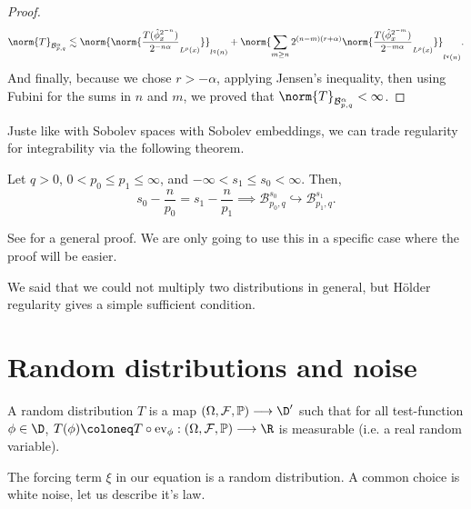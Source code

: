 \begin{proof}
     \begin{equation*}
        \norm{T}_{\mathcal{B}^\alpha_{p,q}} \lesssim \norm{\norm{\frac{T(\hat{\phi}^{2^{-n}}_{x})}{2^{-n\alpha}}_{L^p(x)}}}_{l^q(n)} +  \norm{\sum_{m\geq n} 2^{(n-m)(r+\alpha)} \norm{\frac{T(\hat{\phi}^{2^{-m}}_{x})}{2^{-m\alpha}}_{L^p(x)}}}_{l^q(n)}.
    \end{equation*}
    And finally, because we chose $r>-\alpha$, applying Jensen's inequality, then using Fubini for the sums in $n$ and $m$, we proved that $\norm{T}_{\mathcal{B}^\alpha_{p,q}}<\infty$.





    
\end{proof}


Juste like with Sobolev spaces with Sobolev embeddings, we can trade regularity for integrability via the following theorem.

\begin{theorem}
    Let $q>0$, $0<p_0 \leq p_1 \leq \infty$, and $-\infty < s_1 \leq s_0 < \infty$.
    Then,
    $$s_0 - \frac{n}{p_0} = s_1 - \frac{n}{p_1} \implies \mathcal{B}^{s_0}_{p_0,q} \hookrightarrow \mathcal{B}^{s_1}_{p_1,q}.$$
\end{theorem}

See \cite{Tri83} for a general proof. We are only going to use this in a specific case where the proof will be easier.

We said that we could not multiply two distributions in general, but Hölder regularity gives a simple sufficient condition.


    



\section{Random distributions and noise}

\begin{definition}
    A random distribution $T$ is a map $(\Omega, \mathcal{F}, \mathbb{P}) \longrightarrow \D'$ such that for all test-function $\phi \in \D$,
    $T(\phi)\coloneq T \circ \text{ev}_\phi : (\Omega, \mathcal{F}, \mathbb{P}) \longrightarrow \R$ is measurable (i.e. a real random variable).
\end{definition}

The forcing term $\xi$ in our equation is a random distribution. A common choice is white noise, let us describe it's law.


